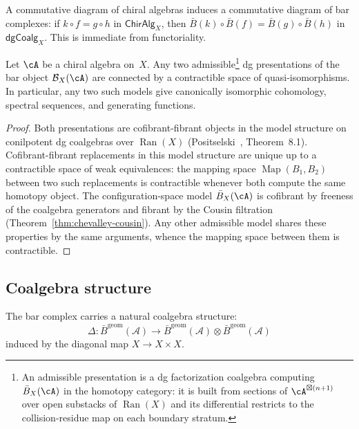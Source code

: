 \begin{corollary}\label{cor:bar-natural}
\label{cor:why-functoriality}
A commutative diagram of chiral algebras induces a commutative diagram of bar complexes: if $k \circ f = g \circ h$ in $\mathsf{ChirAlg}_X$, then $\bar{B}(k) \circ \bar{B}(f) = \bar{B}(g) \circ \bar{B}(h)$ in $\mathsf{dgCoalg}_X$.  This is immediate from functoriality.
\end{corollary}

\begin{proposition}
\label{prop:model-independence}
Let $\cA$ be a chiral algebra on~$X$.
Any two admissible\footnote{An admissible presentation is a
dg factorization coalgebra computing $\bar{B}_X(\cA)$ in the homotopy
category: it is built from sections of $\cA^{\boxtimes(n+1)}$ over
open substacks of $\operatorname{Ran}(X)$ and its differential restricts
to the collision-residue map on each boundary stratum.}
dg presentations of the bar object
$\mathcal{B}_X(\cA)$ are connected by a contractible space of
quasi-isomorphisms.  In particular, any two such models give
canonically isomorphic cohomology, spectral sequences, and generating
functions.
\end{proposition}

\begin{proof}
Both presentations are cofibrant-fibrant objects in the model structure
on conilpotent dg coalgebras over $\operatorname{Ran}(X)$
(Positselski~\cite{Positselski11}, Theorem~8.1).  Cofibrant-fibrant
replacements in this model structure are unique up to a contractible
space of weak equivalences: the mapping space
$\operatorname{Map}(B_1, B_2)$ between two such replacements is
contractible whenever both compute the same homotopy object.
The configuration-space model $\bar{B}_X(\cA)$ is cofibrant by
freeness of the coalgebra generators and fibrant by the Cousin
filtration (Theorem~\ref{thm:chevalley-cousin}).  Any other admissible
model shares these properties by the same arguments, whence the
mapping space between them is contractible.
\end{proof}

\subsection{Coalgebra structure}

\begin{theorem}\label{thm:bar-coalgebra}
The bar complex carries a natural coalgebra structure:
\[\Delta: \bar{B}^{\text{geom}}(\mathcal{A}) \to \bar{B}^{\text{geom}}(\mathcal{A}) \otimes \bar{B}^{\text{geom}}(\mathcal{A})\]
induced by the diagonal map $X \to X \times X$.
\end{theorem}

